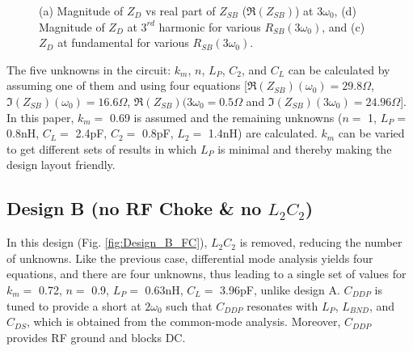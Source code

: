 \documentclass[conference]{IEEEtran}
\begin{document}
\begin{figure}[!t]
\begin{subfigure}{0.5\textwidth}
\caption{}
\label{fig:Design_A_Rn_var_1H}
\end{subfigure}
\caption{(a) Magnitude of $Z_{D}$ vs real part of $Z_{SB}$ ($\Re(Z_{SB})$) at $3\omega_0$, (d) Magnitude of $Z_D$ at $3^{rd}$ harmonic for various $R_{SB}(3\omega_0)$, and (c) $Z_D$ at fundamental for various $R_{SB}(3\omega_0)$.}
\label{fig:Design_A_Rn_var}
\vspace{-0.2in}
\end{figure}

The five unknowns in the circuit: $k_m$, $n$, $L_P$, $C_2$, and $C_L$ can be calculated by assuming one of them and using four equations [$\Re(Z_{SB})(\omega_0) =  29.8 \Omega$, $\Im(Z_{SB})(\omega_0) = 16.6\Omega$, $\Re(Z_{SB})(3\omega_0 = 0.5\Omega$ and  $\Im(Z_{SB})(3\omega_0) = 24.96\Omega$]. In this paper, $k_m=$ 0.69 is assumed and the remaining unknowns ($n =$ 1, $L_P =$ 0.8nH, $C_L =$ 2.4pF, $C_2 =$ 0.8pF, $L_2 =$ 1.4nH) are calculated. $k_m$ can be varied to get different sets of results in which $L_P$ is minimal and thereby making the design layout friendly.


\subsection{Design B (no RF Choke \& no $L_2C_2$)}


In this design (Fig. \ref{fig:Design_B_FC}), $L_2C_2$ is removed, reducing the number of unknowns. Like the previous case, differential mode analysis yields four equations, and there are four unknowns, thus leading to a single set of values for $k_m=$ 0.72, $n =$ 0.9, $L_P =$ 0.63nH, $C_L =$ 3.96pF, unlike design A. $C_{DDP}$ is tuned to provide a short at $2\omega_0$ such that $C_{DDP}$ resonates with $L_P$, $L_{BND}$, and $C_{DS}$, which is obtained from the common-mode analysis. Moreover, $C_{DDP}$ provides RF ground and blocks DC.
\end{document}
